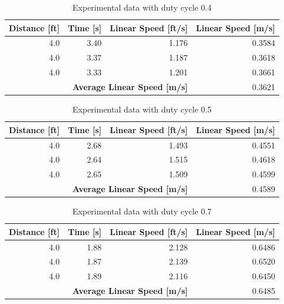 \documentclass[fontsize=11pt, %
                             paper=letter, %
                             openany, %
                             captions=tableheading,
                             index=totoc,
                             hyperref]{labbook}
\begin{document}
\begin{addmargin}[0cm]{0cm}
\begin{table}[h!]
    \centering
    \begin{tabular}{r|r|r|r}
        \toprule
        \textbf{Distance [ft]} & \textbf{Time [s]} & \textbf{Linear Speed [ft/s]} & \textbf{Linear Speed [m/s]}\\
        \toprule
        4.0 & 3.40 & 1.176 & 0.3584\\
        4.0 & 3.37 & 1.187 & 0.3618\\
        4.0 & 3.33 & 1.201 & 0.3661\\
        \bottomrule
        \multicolumn{3}{r|}{\textbf{Average Linear Speed [m/s]}} & 0.3621\\
        \bottomrule
    \end{tabular}
    \caption{Experimental data with duty cycle 0.4}
    \label{tab:duty0.4}
\end{table}

\begin{table}[h!]
    \centering
    \begin{tabular}{r|r|r|r}
        \toprule
        \textbf{Distance [ft]} & \textbf{Time [s]} & \textbf{Linear Speed [ft/s]} & \textbf{Linear Speed [m/s]}\\
        \toprule
        4.0 & 2.68 & 1.493 & 0.4551\\
        4.0 & 2.64 & 1.515 & 0.4618\\
        4.0 & 2.65 & 1.509 & 0.4599\\
        \bottomrule
        \multicolumn{3}{r|}{\textbf{Average Linear Speed [m/s]}} & 0.4589\\
        \bottomrule
    \end{tabular}
    \caption{Experimental data with duty cycle 0.5}
    \label{tab:duty0.5}
\end{table}

\begin{table}[h!]
    \centering
    \begin{tabular}{r|r|r|r}
        \toprule
        \textbf{Distance [ft]} & \textbf{Time [s]} & \textbf{Linear Speed [ft/s]} & \textbf{Linear Speed [m/s]}\\
        \toprule
        4.0 & 1.88 & 2.128 & 0.6486\\
        4.0 & 1.87 & 2.139 & 0.6520\\
        4.0 & 1.89 & 2.116 & 0.6450\\
        \bottomrule
        \multicolumn{3}{r|}{\textbf{Average Linear Speed [m/s]}} & 0.6485\\
        \bottomrule
    \end{tabular}
    \caption{Experimental data with duty cycle 0.7}
    \label{tab:duty0.7}
\end{table}


\end{addmargin}
\end{document}
